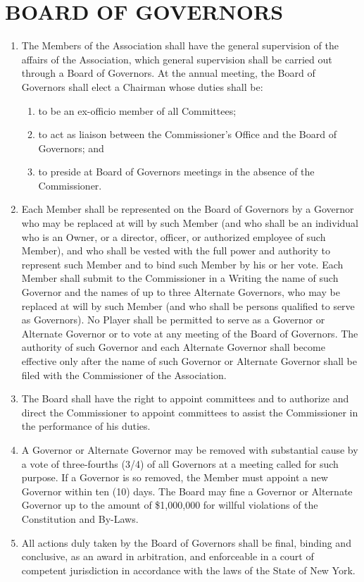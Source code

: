 \documentclass[]{book}
\providecommand{\tightlist}{%
  \setlength{\itemsep}{0pt}\setlength{\parskip}{0pt}}
\theoremstyle{definition}
\theoremstyle{definition}
\theoremstyle{definition}
\theoremstyle{remark}
\begin{document}
\section{BOARD OF GOVERNORS}\label{board-of-governors}

\begin{enumerate}
\def\labelenumi{(\alph{enumi})}
\tightlist
\item
  The Members of the Association shall have the general supervision of
  the affairs of the Association, which general supervision shall be
  carried out through a Board of Governors. At the annual meeting, the
  Board of Governors shall elect a Chairman whose duties shall be:

  \begin{enumerate}
  \def\labelenumii{(\roman{enumii})}
  \tightlist
  \item
    to be an ex-officio member of all Committees;
  \item
    to act as liaison between the Commissioner's Office and the Board of
    Governors; and
  \item
    to preside at Board of Governors meetings in the absence of the
    Commissioner.
  \end{enumerate}
\item
  Each Member shall be represented on the Board of Governors by a
  Governor who may be replaced at will by such Member (and who shall be
  an individual who is an Owner, or a director, officer, or authorized
  employee of such Member), and who shall be vested with the full power
  and authority to represent such Member and to bind such Member by his
  or her vote. Each Member shall submit to the Commissioner in a Writing
  the name of such Governor and the names of up to three Alternate
  Governors, who may be replaced at will by such Member (and who shall
  be persons qualified to serve as Governors). No Player shall be
  permitted to serve as a Governor or Alternate Governor or to vote at
  any meeting of the Board of Governors. The authority of such Governor
  and each Alternate Governor shall become effective only after the name
  of such Governor or Alternate Governor shall be filed with the
  Commissioner of the Association.
\item
  The Board shall have the right to appoint committees and to authorize
  and direct the Commissioner to appoint committees to assist the
  Commissioner in the performance of his duties.
\item
  A Governor or Alternate Governor may be removed with substantial cause
  by a vote of three-fourths (3/4) of all Governors at a meeting called
  for such purpose. If a Governor is so removed, the Member must appoint
  a new Governor within ten (10) days. The Board may fine a Governor or
  Alternate Governor up to the amount of \$1,000,000 for willful
  violations of the Constitution and By-Laws.
\item
  All actions duly taken by the Board of Governors shall be final,
  binding and conclusive, as an award in arbitration, and enforceable in
  a court of competent jurisdiction in accordance with the laws of the
  State of New York.
\end{enumerate}
\end{document}
